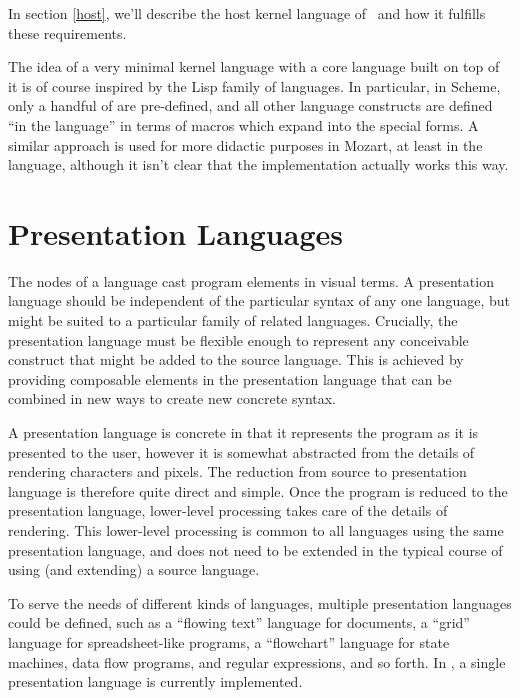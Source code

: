 In section \ref{host}, we'll describe the host kernel language of \Meta\ and how it fulfills these requirements.

The idea of a very minimal kernel language with a core language built on top of it is of course inspired by the Lisp family of languages. In particular, in Scheme\cite{scheme}, only a handful of  are pre-defined, and all other language constructs are defined ``in the language'' in terms of macros which expand into the special forms. A similar approach is used for more didactic purposes in Mozart\cite{mozart}, at least in  the language, although it isn't clear that the implementation actually works this way.

%
%

\section{Presentation Languages}
The nodes of a  language cast program elements in visual terms. A presentation language should be independent of the particular syntax of any one language, but might be suited to a particular family of related languages. Crucially, the presentation language must be flexible enough to represent any conceivable construct that might be added to the source language. This is achieved by providing composable elements in the presentation language that can be combined in new ways to create new concrete syntax.

A presentation language is concrete in that it represents the program as it is presented to the user, however it is somewhat abstracted from the details of rendering characters and pixels. The reduction from source to presentation language is therefore quite direct and simple. Once the program is reduced to the presentation language, lower-level processing takes care of the details of rendering. This lower-level processing is common to all languages using the same presentation language, and does not need to be extended in the typical course of using (and extending) a source language.

To serve the needs of different kinds of languages, multiple presentation languages could be defined, such as a ``flowing text'' language for documents, a ``grid'' language for spreadsheet-like programs, a ``flowchart'' language for state machines, data flow programs, and regular expressions, and so forth. In \Meta, a single presentation language is currently implemented.

